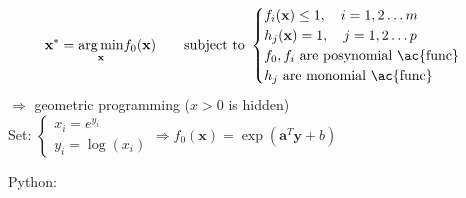 \begin{equation}
	\textbf{x}^* = \underset{\textbf{x}}{\arg\min} f_0(\textbf{x}) \qquad \text{subject to } \begin{cases}
		f_i(\textbf{x}) \leq 1, \quad i=1,2\dots m\\
		h_j(\textbf{x}) = 1, \quad j=1,2\dots p\\
		f_0, f_i \text{ are posynomial \ac{func}}\\
		h_j \text{ are monomial \ac{func}}\\
	\end{cases}
\end{equation}
$\Rightarrow$ geometric programming ($x>0$ is hidden)\\
Set: \qquad $\begin{cases}
	x_i = e^{y_i}\\
	y_i = \log(x_i)
\end{cases} \Rightarrow f_0(\textbf{x}) = \exp(\textbf{a}^T \textbf{y} + b)$

Python: {\color{red} }